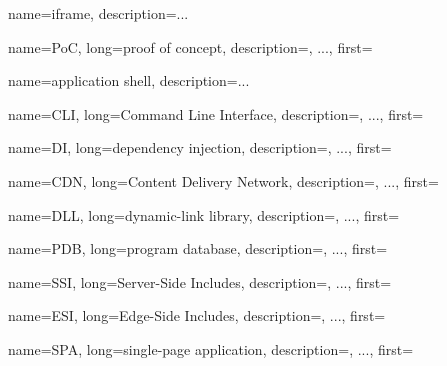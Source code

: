 {
    name=iframe,
    description={...}%
}

{
    name=PoC,
    long={proof of concept},
    description={, ...},%
    first=
}

{
    name={application shell},
    description={...}%
}


{
    name=CLI,
    long={Command Line Interface},
    description={, ...},%
    first=
}

{
    name=DI,
    long={dependency injection},
    description={, ...},%
    first=
}

{
    name=CDN,
    long={Content Delivery Network},
    description={, ...},%
    first=
}

{
    name=DLL,
    long={dynamic-link library},
    description={, ...},%
    first=
}

{
    name=PDB,
    long={program database},
    description={, ...},%
    first=
}

{
    name=SSI,
    long={Server-Side Includes},
    description={, ...},%
    first=
}

{
    name=ESI,
    long={Edge-Side Includes},
    description={, ...},%
    first=
}

{
    name=SPA,
    long={single-page application},
    description={, ...},%
    first=
}
